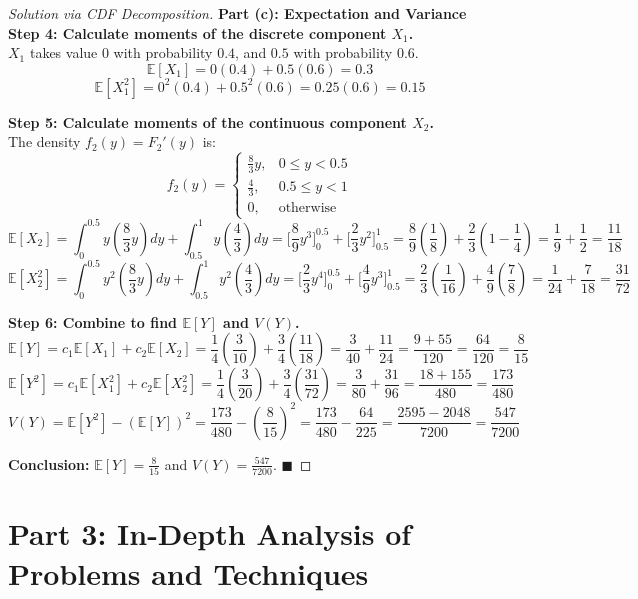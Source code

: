 \documentclass[11pt, a4paper]{article}
\theoremstyle{definition}
\theoremstyle{remark}
\newcommand{\E}{\mathbb{E}}
\begin{document}
\begin{proof}[Solution via CDF Decomposition]
\textbf{Part (c): Expectation and Variance} \\
\textbf{Step 4: Calculate moments of the discrete component $X_1$.} \\
$X_1$ takes value $0$ with probability $0.4$, and $0.5$ with probability $0.6$.
\[ \E[X_1] = 0(0.4) + 0.5(0.6) = 0.3 \]
\[ \E[X_1^2] = 0^2(0.4) + 0.5^2(0.6) = 0.25(0.6) = 0.15 \]

\textbf{Step 5: Calculate moments of the continuous component $X_2$.} \\
The density $f_2(y) = F_2'(y)$ is:
\[ f_2(y) = \begin{cases} \frac{8}{3}y, & 0 \le y < 0.5 \\ \frac{4}{3}, & 0.5 \le y < 1 \\ 0, & \text{otherwise} \end{cases} \]
\[ \E[X_2] = \int_{0}^{0.5} y\left(\frac{8}{3}y\right) dy + \int_{0.5}^{1} y\left(\frac{4}{3}\right) dy = \Big[ \frac{8}{9}y^3 \Big]_{0}^{0.5} + \Big[ \frac{2}{3}y^2 \Big]_{0.5}^{1} = \frac{8}{9}\left(\frac{1}{8}\right) + \frac{2}{3}\left(1 - \frac{1}{4}\right) = \frac{1}{9} + \frac{1}{2} = \frac{11}{18} \]
\[ \E[X_2^2] = \int_{0}^{0.5} y^2\left(\frac{8}{3}y\right) dy + \int_{0.5}^{1} y^2\left(\frac{4}{3}\right) dy = \Big[ \frac{2}{3}y^4 \Big]_{0}^{0.5} + \Big[ \frac{4}{9}y^3 \Big]_{0.5}^{1} = \frac{2}{3}\left(\frac{1}{16}\right) + \frac{4}{9}\left(\frac{7}{8}\right) = \frac{1}{24} + \frac{7}{18} = \frac{31}{72} \]

\textbf{Step 6: Combine to find $\E[Y]$ and $V(Y)$.} \\
\[ \E[Y] = c_1 \E[X_1] + c_2 \E[X_2] = \frac{1}{4}\left(\frac{3}{10}\right) + \frac{3}{4}\left(\frac{11}{18}\right) = \frac{3}{40} + \frac{11}{24} = \frac{9 + 55}{120} = \frac{64}{120} = \frac{8}{15} \]
\[ \E[Y^2] = c_1 \E[X_1^2] + c_2 \E[X_2^2] = \frac{1}{4}\left(\frac{3}{20}\right) + \frac{3}{4}\left(\frac{31}{72}\right) = \frac{3}{80} + \frac{31}{96} = \frac{18 + 155}{480} = \frac{173}{480} \]
\[ V(Y) = \E[Y^2] - (\E[Y])^2 = \frac{173}{480} - \left(\frac{8}{15}\right)^2 = \frac{173}{480} - \frac{64}{225} = \frac{2595 - 2048}{7200} = \frac{547}{7200} \]

\textbf{Conclusion:} $\E[Y] = \frac{8}{15}$ and $V(Y) = \frac{547}{7200}$. $\blacksquare$
\end{proof}

\newpage
\section{Part 3: In-Depth Analysis of Problems and Techniques}
\end{document}
